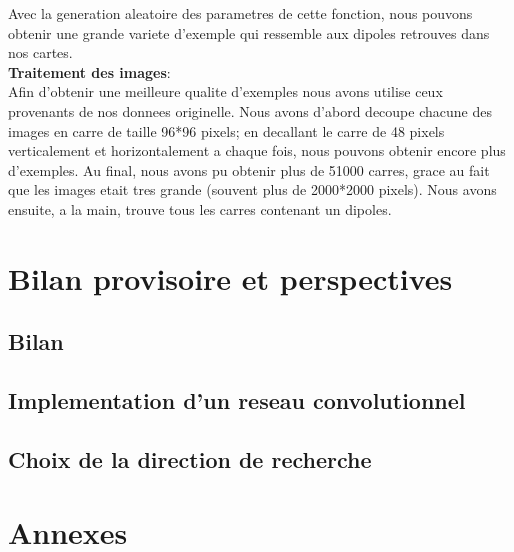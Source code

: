 \documentclass[a4paper, 12pt, titlepage, oneside]{article}
\begin{document}
	Avec la generation aleatoire des parametres de cette fonction, nous pouvons obtenir une grande variete d'exemple qui ressemble aux dipoles retrouves dans nos cartes.\\
	\textbf{Traitement des images}:\\
	Afin d'obtenir une meilleure qualite d'exemples nous avons utilise ceux provenants de nos donnees originelle. Nous avons d'abord decoupe chacune des images en carre de taille 96*96 pixels; en decallant le carre de 48 pixels verticalement et horizontalement a chaque fois, nous pouvons obtenir encore plus d'exemples. Au final, nous avons pu obtenir plus de 51000 carres, grace au fait que les images etait tres grande (souvent plus de 2000*2000 pixels). Nous avons ensuite, a la main, trouve tous les carres contenant un dipoles. %
\newpage
\section{Bilan provisoire et perspectives}
	\subsection{Bilan} %
	\subsection{Implementation d'un reseau convolutionnel}
	\subsection{Choix de la direction de recherche}

\newpage
\section{Annexes}

\medskip
\newpage
\printbibliography
\end{document}
